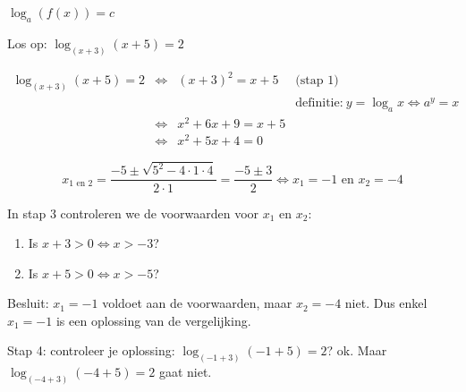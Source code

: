 \begin{voorbeeld}
$ \log_{a}\left(f(x)\right)=c$

Los op: $ \log_{(x+3)}(x+5)=2$

\begin{equation*}
 \begin{array}{rclr}
 \log_{(x+3)}(x+5)=2 & 
	\iff & (x+3)^{2} = x+5 & \text{(stap 1)} \\
	& & & \textrm{definitie:}\: y=\log_{a}x\Leftrightarrow a^{y}=x\\
	&\iff & x^{2}+6x+9 = x+5 & \text{}\\
	&\iff & x^{2}+5x+4 = 0 & 
	\end{array}
\end{equation*}


\begin{equation*}
x_{1\textrm{ en }2}=\frac{-5\pm\sqrt{5^{2}-4\cdot 1\cdot 4}}{2\cdot 1}=\frac{-5\pm3}{2}\iff x_{1}=-1
\text{ en }x_{2}=-4
\end{equation*}

In stap 3 controleren we de voorwaarden voor $x_{1}$ en $x_{2}$:

\begin{enumerate}
	\item Is $x+3>0\iff x>-3$? 
	\item Is $x+5>0\iff x>-5$?
\end{enumerate}

Besluit: $ x_{1}=-1$ voldoet aan de voorwaarden, maar
$ x_{2}=-4$ niet. Dus enkel $ x_{1}=-1$
is een oplossing van de vergelijking.

Stap 4: controleer je oplossing: $ \log_{(-1+3)}(-1+5)=2$?
ok. Maar $ \log_{(-4+3)}(-4+5)=2$ gaat niet.

\end{voorbeeld}

